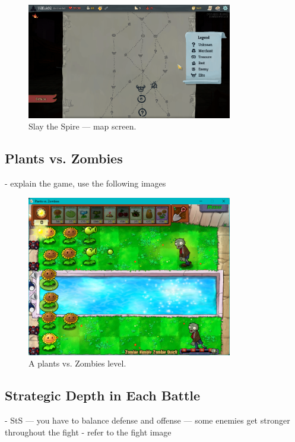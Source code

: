 \begin{figure}[htb]
    \centering
    \includegraphics[width=0.8\textwidth]{img/Slay-the-Spire-Map.png}
    \caption{Slay the Spire --- map screen.}
    \label{fig:slay-the-spire-map}
\end{figure}

\subsection{Plants vs. Zombies}

- explain the game, use the following images

\begin{figure}[htb]
    \centering
    \includegraphics[width=0.8\textwidth]{img/Plants-vs-Zombies-Fight.png}
    \caption{A plants vs. Zombies level.}
    \label{fig:plants-vs-zombies-fight}
\end{figure}

\subsection{Strategic Depth in Each Battle}

- StS --- you have to balance defense and offense --- some enemies get stronger throughout the fight - refer to the fight image

